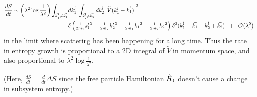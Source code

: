 \begin{align}
\frac{d S}{dt} \sim \left(\lambda^2 \log\frac{1}{\lambda^2}\right) \int_{\vec{k_1^\prime}\neq \vec{k_1}}& d\vec{k_1^\prime} \;\int_{\vec{k_2^\prime}\neq \vec{k_2}} d\vec{k_2^\prime} \left|\widetilde{V}(\vec{k_1^\prime}-\vec{k_1})\right|^2
\\&\delta\left({\textstyle\frac{1}{2m_1}{{k_1^\prime}}^2 + \frac{1}{2m_2}{{k_2^\prime}}^2 - \frac{1}{2m_1}{k_1}^2 - \frac{1}{2m_2}{k_2}^2}\right) \,\delta^3(\vec{k_1^\prime}-\vec{k_1}-\vec{k_2^\prime}+\vec{k_2}) \;\;+\;\;\mathcal{O}{\left(\lambda^2\right)} \nonumber
\end{align}
in the limit where scattering has been happening for a long time. Thus the rate in entropy growth is proportional to a 2D integral of \(\widetilde{V}\) in momentum space, and also proportional to \(\lambda^2 \log \frac{1}{\lambda^2}\).

(Here, \(\frac{d S}{dt} = \frac{d}{dt} \Delta S\) since the free particle Hamiltonian \(\hat{H}_0\) doesn't cause a change in subsystem entropy.)


